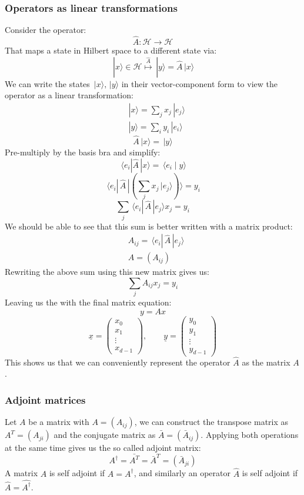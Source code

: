 \documentclass[12pt]{article}
\newcommand{\ket}[1]{\,|#1\rangle}
\newcommand{\bra}[1]{\,\langle #1|}
\newcommand{\braket}[2]{\,\langle #1\mid #2\rangle}
\begin{document}
\subsubsection*{Operators as linear transformations}
Consider the operator:
\[\hat{A}:\mathcal{H}\to \mathcal{H}\]
That maps a state in Hilbert space to a different state via:
\[\ket{x}\in\mathcal{H}\overset{\hat{A}}{\longmapsto}\ket{y}=\hat{A}\ket{x}\]
We can write the states \(\ket{x},\ket{y}\) in their vector-component form to view the operator as a linear transformation:
\begin{align*}
    &\ket{x}=\sum_jx_j\ket{e_j} \\
    &\ket{y}=\sum_iy_i\ket{e_i}
\end{align*}
\[\hat{A}\ket{x}=\ket{y}\]
Pre-multiply by the basis bra and simplify:
\[\bra{e_i}\hat{A}\ket{x}=\braket{e_i}{y}\]
\[\bra{e_i}\,\hat{A}\ket{\left(\sum_jx_j\ket{e_j}\right)}=y_i\]
\[\sum_j\bra{e_i}\,\hat{A}\ket{e_j}x_j=y_i\]
We should be able to see that this sum is better written with a matrix product:
\begin{align*}
    &A_{ij}=\bra{e_i}\,\hat{A}\ket{e_j} \\
    &A=(A_{ij})
\end{align*}
Rewriting the above sum using this new matrix gives us:
\[\sum_jA_{ij}x_j=y_i\]
Leaving us the with the final matrix equation:
\[y=Ax\]
\[\underline{x}=\begin{pmatrix}
    x_0 \\ x_1 \\ \vdots \\ x_{d-1}
\end{pmatrix},\qquad \underline{y}=\begin{pmatrix}
    y_0 \\ y_1 \\ \vdots \\ y_{d-1}
\end{pmatrix}\]
This shows us that we can conveniently represent the operator \(\hat{A}\) as the matrix \(A\).
\subsubsection*{Adjoint matrices}
Let \(A\) be a matrix with \(A=(A_{ij})\), we can construct the transpose matrix as \(A^T=(A_{ji})\) and the conjugate matrix as \(\bar{A}=(\bar{A}_{ij})\). Applying both operations at the same time gives us the so called adjoint matrix:
\[A^\dagger=\bar{A^T}=\bar{A}^T=(\bar{A}_{ji})\]
A matrix \(A\) is self adjoint if \(A=A^\dagger\), and similarly an operator \(\hat{A}\) is self adjoint if \(\hat{A}=\hat{A^\dagger}\).
\end{document}
